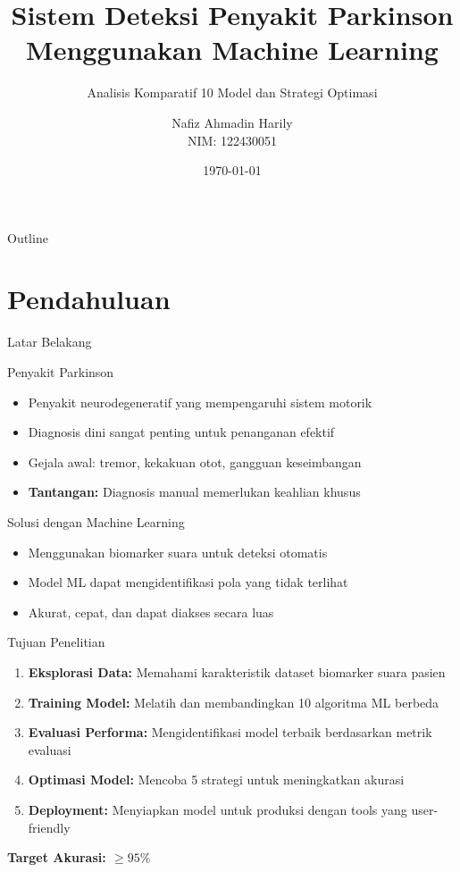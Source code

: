 \documentclass[aspectratio=169]{beamer}
\title[Deteksi Parkinson dengan ML]{Sistem Deteksi Penyakit Parkinson \\ Menggunakan Machine Learning}
\subtitle{Analisis Komparatif 10 Model dan Strategi Optimasi}
\author{Nafiz Ahmadin Harily \\ NIM: 122430051}
\institute{Program Studi Teknik Biomedis \\ Institut Teknologi Sumatera (ITERA)}
\date{\today}
\begin{document}
\begin{frame}
\titlepage
\end{frame}

\begin{frame}{Outline}
\tableofcontents
\end{frame}

\section{Pendahuluan}

\begin{frame}{Latar Belakang}
\begin{block}{Penyakit Parkinson}
\begin{itemize}
    \item Penyakit neurodegeneratif yang mempengaruhi sistem motorik
    \item Diagnosis dini sangat penting untuk penanganan efektif
    \item Gejala awal: tremor, kekakuan otot, gangguan keseimbangan
    \item \textbf{Tantangan:} Diagnosis manual memerlukan keahlian khusus
\end{itemize}
\end{block}

\begin{block}{Solusi dengan Machine Learning}
\begin{itemize}
    \item Menggunakan biomarker suara untuk deteksi otomatis
    \item Model ML dapat mengidentifikasi pola yang tidak terlihat
    \item Akurat, cepat, dan dapat diakses secara luas
\end{itemize}
\end{block}
\end{frame}

\begin{frame}{Tujuan Penelitian}
\begin{enumerate}
    \item \textbf{Eksplorasi Data:} Memahami karakteristik dataset biomarker suara pasien
    \item \textbf{Training Model:} Melatih dan membandingkan 10 algoritma ML berbeda
    \item \textbf{Evaluasi Performa:} Mengidentifikasi model terbaik berdasarkan metrik evaluasi
    \item \textbf{Optimasi Model:} Mencoba 5 strategi untuk meningkatkan akurasi
    \item \textbf{Deployment:} Menyiapkan model untuk produksi dengan tools yang user-friendly
\end{enumerate}

\vspace{0.5cm}
\begin{center}
\textbf{\color{darkgreen}Target Akurasi: $\geq 95\%$}
\end{center}
\end{frame}
\end{document}
